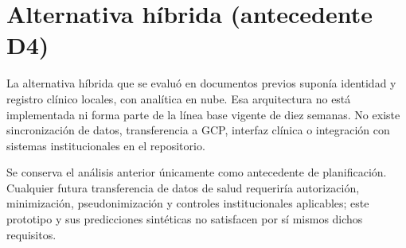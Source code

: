 \section{Alternativa híbrida (antecedente D4)}

La alternativa híbrida que se evaluó en documentos previos suponía identidad y registro clínico locales, con analítica en nube. Esa arquitectura no está implementada ni forma parte de la línea base vigente de diez semanas. No existe sincronización de datos, transferencia a GCP, interfaz clínica o integración con sistemas institucionales en el repositorio.

Se conserva el análisis anterior únicamente como antecedente de planificación. Cualquier futura transferencia de datos de salud requeriría autorización, minimización, pseudonimización y controles institucionales aplicables; este prototipo y sus predicciones sintéticas no satisfacen por sí mismos dichos requisitos.
